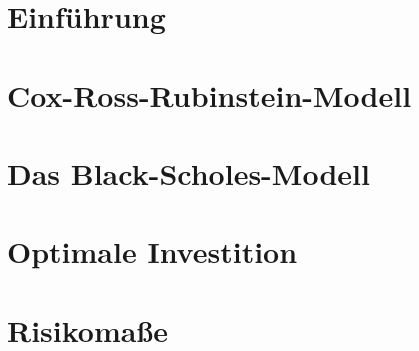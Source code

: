 \documentclass[ngerman, a4paper, 11pt]{report}
\institute{Stochastik}
\begin{document}
\makeTUtitle
    
\tableofcontents

\chapter{Einführung}
\label{chapter_1_einfuehrung}






\chapter{Cox-Ross-Rubinstein-Modell}
\label{chapter_2_crr}





\chapter{Das Black-Scholes-Modell}
\label{chapter_3_blackScholes}


\chapter{Optimale Investition}
\label{chapter_4_optimaleInvesition}






\chapter{Risikomaße}
\label{chapter_5_risikomasse}





\end{document}
